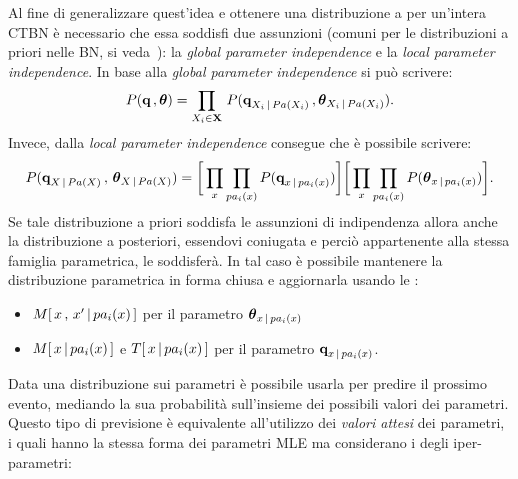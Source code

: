 Al fine di generalizzare quest'idea e ottenere una distribuzione a  per un'intera \acs{CTBN} è necessario che essa soddisfi due assunzioni (comuni per le distribuzioni a priori nelle \acl{BN}, si veda~\citet{Heckerman1996}): la \emph{global parameter independence} e la \emph{local parameter independence}. In base alla \emph{global parameter independence} si può scrivere:
\begin{equation}\label{eq:ctbn-bayesian-params-globalind}
P(\boldsymbol{\textbf{\text{q}}}\,,\boldsymbol{\textbf{\text{$\theta$}}})=\prod_{\mathnormal{X}_i\in\mathbf{X}}\,P(\boldsymbol{\textbf{\text{q}}}_{\mathnormal{X}_i\,\arrowvert\,Pa(\mathnormal{X}_i)}\,,\boldsymbol{\textbf{\text{$\theta$}}}_{\mathnormal{X}_i\,\arrowvert\,Pa(\mathnormal{X}_i)})\text{.}
\end{equation}
Invece, dalla \emph{local parameter independence} consegue che è possibile scrivere:
\footnotesize
\begin{equation}\label{eq:ctbn-bayesian-params-localind}
P(\boldsymbol{\textbf{\text{q}}}_{\mathnormal{X}\,\arrowvert\,Pa(\mathnormal{X})}\,,\,\boldsymbol{\textbf{\text{$\theta$}}}_{\mathnormal{X}\,\arrowvert\,Pa(\mathnormal{X})}) = \bigg[ \prod_{\mathnormal{x}}\prod_{pa_i(\mathnormal{x})} P(\boldsymbol{\textbf{\text{q}}}_{\mathnormal{x}\,\arrowvert\,pa_i(\mathnormal{x})}) \bigg] \bigg[ \prod_{\mathnormal{x}}\prod_{pa_i(\mathnormal{x})} P(\boldsymbol{\textbf{\text{$\theta$}}}_{\mathnormal{x}\,\arrowvert\,pa_i(\mathnormal{x})}) \bigg]\text{\normalsize .}
\end{equation}\normalsize
Se tale distribuzione a priori soddisfa le assunzioni di indipendenza allora anche la distribuzione a posteriori, essendovi coniugata e perciò appartenente alla stessa famiglia parametrica, le soddisferà. In tal caso è possibile mantenere la distribuzione parametrica in forma chiusa e aggiornarla usando le \emph{\keyword{\stats{}}}:
\begin{itemize}
\item $\mstat[x]{\setel{x}^{\prime}\,\arrowvert\,pa_i(\setel{x})}$ per il parametro $\boldsymbol{\textbf{\text{$\theta$}}}_{\mathnormal{x}\,\arrowvert\,pa_i(\mathnormal{x})}$
\item $\mstat{x\,\arrowvert\,pa_i(\setel{x})}$ e $T[\,\mathnormal{x\,\arrowvert\,pa_i(\mathnormal{x})}\,]$ per il parametro $\boldsymbol{\textbf{\text{q}}}_{\mathnormal{x}\,\arrowvert\,pa_i(\mathnormal{x})}$.
\end{itemize}
Data una distribuzione sui parametri è possibile usarla per predire il prossimo evento, mediando la sua probabilità sull'insieme dei possibili valori dei parametri. Questo tipo di previsione è equivalente all'utilizzo dei \emph{valori attesi} dei parametri, i quali hanno la stessa forma dei parametri \acl{MLE} ma considerano i \emph{} degli iper-parametri:
